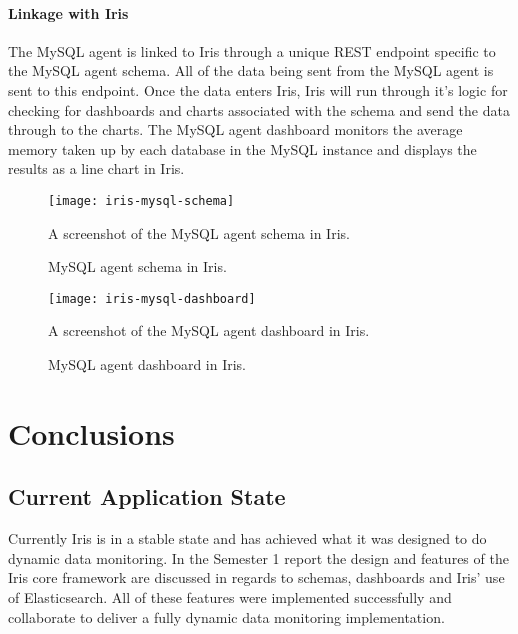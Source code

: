 \documentclass[12pt,a4paper,titlepage]{report}
\begin{document}
\subsubsection{Linkage with Iris}
The MySQL agent is linked to Iris through a unique REST endpoint specific to the MySQL agent schema. All of the data being sent from the MySQL agent is sent to this endpoint. Once the data enters Iris, Iris will run through it's logic for checking for dashboards and charts associated with the schema and send the data through to the charts. 
The MySQL agent dashboard monitors the average memory taken up by each database in the MySQL instance and displays the results as a line chart in Iris.
\begin{figure}[H]
\begin{tcolorbox}
\begin{center}
\texttt{[image: iris-mysql-schema]}
\end{center}
A screenshot of the MySQL agent schema in Iris.
\end{tcolorbox}
\caption{MySQL agent schema in Iris.}
\end{figure}

\begin{figure}[H]
\begin{tcolorbox}
\begin{center}
\texttt{[image: iris-mysql-dashboard]}
\end{center}
A screenshot of the MySQL agent dashboard in Iris.
\end{tcolorbox}
\caption{MySQL agent dashboard in Iris.}
\end{figure}

\chapter{Conclusions}
\section{Current Application State}
Currently Iris is in a stable state and has achieved what it was designed to do dynamic data monitoring. In the Semester 1 report the design and features of the Iris core framework are discussed in regards to schemas, dashboards and Iris' use of Elasticsearch. All of these features were implemented successfully and collaborate to deliver a fully dynamic data monitoring implementation.
\end{document}
